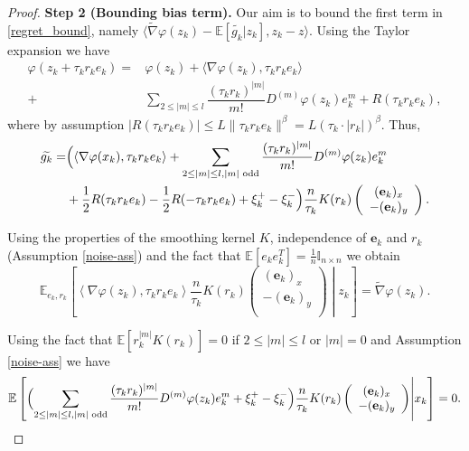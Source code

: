 \documentclass[runningheads]{llncs}
\newcommand{\E}{{\mathbb E}}
\def\E{\mathbb E}
\begin{document}
\begin{proof}
{\bf Step 2 (Bounding bias term).} Our aim is to bound the first term in \eqref{regret_bound}, namely $\langle \widetilde{\nabla} \varphi(z_k) -  \E \left[\widetilde{g_k} | z_k \right] , z_k - z \rangle $.
Using the Taylor expansion we have
\begin{equation}
\begin{split}
    \varphi \left(z_k + \tau_k r_k e_k\right)
    =& \varphi (z_k) + \langle \nabla \varphi(z_k), \tau_k r_k e_k \rangle \\
    +& \sum_{2\leq |m| \leq l} \dfrac{(\tau_k r_k)^{|m|}}{m!} D^{(m)}\varphi (z_k) e_k^{m} + R(\tau_k r_k e_k),
\end{split}
\end{equation}
where by assumption $|R(\tau_k r_k e_k)| \leq L \|\tau_k r_k e_k\|^{\beta} = L (\tau_k \cdot |r_k|)^{\beta} $.
Thus, 
\begin{equation}\label{grad_taylor_expansion}
\begin{split}
    \widetilde{g_k} = &
     \Bigl( \langle \nabla \varphi(x_k), \tau_k r_k e_k \rangle 
    + \sum_{2\leq |m| \leq l, |m| \text{ odd}} \dfrac{(\tau_k r_k)^{|m|}}{m!} D^{(m)}\varphi(z_k) e_k^{m}\\
    &+ \frac{1}{2} R(\tau_k r_k e_k) - \frac{1}{2} R(-\tau_k r_k e_k) + \xi^+_k - \xi^-_k \Bigl) \dfrac{n}{\tau_k} K(r_k) \left(
    \begin{array}{c}
    (\mathbf{e}_k)_x\\
    -(\mathbf{e}_k)_y \\
    \end{array}\right) .
\end{split}
\end{equation}

Using the properties of the smoothing kernel $K$, independence of $\mathbf{e}_k$ and $r_k$ (Assumption \ref{noise-ass}) and the fact that $\E\left[ e_k e_k^{T} \right] = \frac 1 n \mathbb{I}_{n \times n}$ we obtain
\begin{equation}\label{first_order_term}
    \E_{e_k, r_k} \left[ \left\langle \nabla \varphi(z_k), \tau_k r_k e_k \right\rangle \dfrac{n}{\tau_k} K(r_k) \left(
    \begin{array}{c}
    (\mathbf{e}_k)_x\\
    -(\mathbf{e}_k)_y \\
    \end{array}\right)
    \middle| z_k \right] = \widetilde{\nabla} \varphi(z_k).
\end{equation}

Using the fact that $\E \left[ r_k^{|m|} K(r_k) \right] = 0$ if $2 \leq |m| \leq l$ or $|m| = 0$ and Assumption \ref{noise-ass} we have
\begin{equation}\label{mid_order_term}
    \E\left[\Bigl(\sum_{2\leq |m| \leq l, |m| \text{ odd}} \dfrac{(\tau_k r_k)^{|m|}}{m!} D^{(m)}\varphi(z_k) e_k^{m}
    + \xi^+_k - \xi^-_k \Bigl) \dfrac{n}{\tau_k} K(r_k) \left(
    \begin{array}{c}
    (\mathbf{e}_k)_x\\
    -(\mathbf{e}_k)_y \\
    \end{array}\right) \middle|x_k \right]= 0.
\end{equation}


\end{proof}
\end{document}
